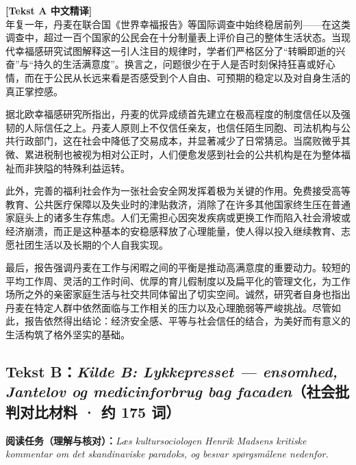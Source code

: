\begin{transbox}
\small
\textbf{\color{NCDTeal}[Tekst A 中文精译]}\\
年复一年，丹麦在联合国《世界幸福报告》等国际调查中始终稳居前列——在这类调查中，超过一百个国家的公民会在十分制量表上评价自己的整体生活状态。当现代幸福感研究试图解释这一引人注目的规律时，学者们严格区分了“转瞬即逝的兴奋”与“持久的生活满意度”。换言之，问题很少在于人是否时刻保持狂喜或好心情，而在于公民从长远来看是否感受到个人自由、可预期的稳定以及对自身生活的真正掌控感。

据北欧幸福感研究所指出，丹麦的优异成绩首先建立在极高程度的制度信任以及强韧的人际信任之上。丹麦人原则上不仅信任亲友，也信任陌生同胞、司法机构与公共行政部门，这在社会中降低了交易成本，并显著减少了日常猜忌。当腐败微乎其微、累进税制也被视为相对公正时，人们便愈发感到社会的公共机构是在为整体福祉而非狭隘的特殊利益运转。

此外，完善的福利社会作为一张社会安全网发挥着极为关键的作用。免费接受高等教育、公共医疗保障以及失业时的津贴救济，消除了在许多其他国家终生压在普通家庭头上的诸多生存焦虑。人们无需担心因突发疾病或更换工作而陷入社会滑坡或经济崩溃，而正是这种基本的安稳感释放了心理能量，使人得以投入继续教育、志愿社团生活以及长期的个人自我实现。

最后，报告强调丹麦在工作与闲暇之间的平衡是推动高满意度的重要动力。较短的平均工作周、灵活的工作时间、优厚的育儿假制度以及扁平化的管理文化，为工作场所之外的亲密家庭生活与社交共同体留出了切实空间。诚然，研究者自身也指出丹麦在特定人群中依然面临与工作相关的压力以及心理脆弱等严峻挑战。尽管如此，报告依然得出结论：经济安全感、平等与社会信任的结合，为美好而有意义的生活构筑了格外坚实的基础。
\end{transbox}

\subsection*{Tekst B：\textit{Kilde B: Lykkepresset --- ensomhed, Jantelov og medicinforbrug bag facaden}（社会批判对比材料 · 约 175 词）}

\textbf{阅读任务（理解与核对）：}\textit{Læs kultursociologen Henrik Madsens kritiske kommentar om det skandinaviske paradoks, og besvar spørgsmålene nedenfor.}

